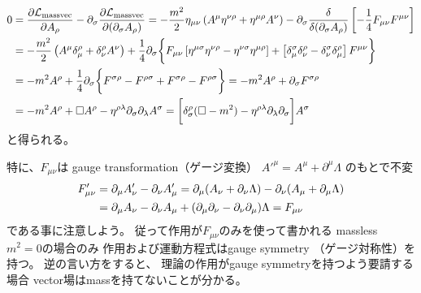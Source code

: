 \begin{subequations}
\begin{align}
    0
    &=
    \dfrac{\partial \mathcal{L}_{\rm massvec}}
        {\partial A_\rho}
    -
    \partial_\sigma
    \dfrac{\partial \mathcal{L}_{\rm massvec}}
        {\partial (\partial_\sigma A_\rho)}
    =
    -
    \dfrac{m^2}{2}
        \eta_{\mu \nu}
        \left(
            A^\mu \eta^{\nu\rho}
        +
            \eta^{\mu\rho} A^\nu
        \right)
    -
    \partial_\sigma
    \dfrac{\delta}
        {\delta (\partial_\sigma A_\rho)}
        \left[
            - \dfrac{1}{4}
            F_{\mu\nu} F^{\mu\nu}
        \right]
\notag\\&
    =
    -
    \dfrac{m^2}{2}
        \left(
            A^\mu \delta_\mu^{\rho}
        +
            \delta_{\nu}^\rho A^\nu
        \right)
    +
    \dfrac{1}{4}
    \partial_\sigma
    \bigg\{
        F_{\mu\nu}
        \left[
            \eta^{\mu \sigma}
            \eta^{\nu \rho}
        -
            \eta^{\nu\sigma}
            \eta^{\mu \rho}
        \right]
    +
        \left[
            \delta_\mu^\sigma
            \delta_\nu^\rho
            -
            \delta_\nu^\sigma
            \delta_\mu^\rho        
        \right]
        F^{\mu\nu}
    \bigg\}
\notag\\&
    =
    -
    m^2
    A^\rho
    +
    \dfrac{1}{4}
    \partial_\sigma
    \bigg\{
        F^{\sigma\rho}
    -
        F^{\rho\sigma}
    +
        F^{\sigma\rho}
    -
        F^{\rho\sigma}
    \bigg\}
=
    -
    m^2
    A^\rho
    +
    \partial_\sigma
        F^{\sigma\rho}
\\&
=
    -
    m^2
    A^\rho
    +
    \Box A^\rho
    -
    \eta^{\rho \lambda}
    \partial_\sigma \partial_\lambda
    A^\sigma
=
    \bigg[
        \delta^\rho_\sigma
        (\Box - m^2)
    -
        \eta^{\rho \lambda}
        \partial_\lambda
        \partial_\sigma
    \bigg]
    A^\sigma
\label{free massive vector field EL eq}
\end{align}
\end{subequations}
と得られる。

特に、$F_{\mu\nu}$は
gauge transformation（ゲージ変換）
$A'^\mu = A^\mu + \partial^\mu \Lambda$
のもとで不変
\begin{align}
    F'_{\mu\nu}
&=
    \partial_\mu A'_\nu
    -
    \partial_\nu A'_\mu
=
    \partial_\mu (A_\nu + \partial_\nu \Lambda)
    -
    \partial_\nu (A_\mu + \partial_\mu \Lambda)
\notag\\&
=
    \partial_\mu A_\nu
    -
    \partial_\nu A_\mu
    + (
        \partial_\mu \partial_\nu
    -
        \partial_\nu \partial_\mu
    )\Lambda
=
    F_{\mu\nu}
\label{gauge invariance of vector field strength}
\end{align}
である事に注意しよう。
従って作用が$F_{\mu\nu}$のみを使って書かれる
massless $m^2 = 0$の場合のみ
作用および運動方程式はgauge symmetry
（ゲージ対称性）を持つ。
逆の言い方をすると、
理論の作用がgauge symmetryを持つよう要請する場合
vector場はmassを持てないことが分かる。

